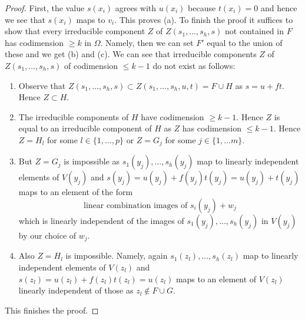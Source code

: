\begin{proof}
\medskip\noindent
First, the value $s(x_i)$ agrees with $u(x_i)$ because
$t(x_i) = 0$ and hence we see that $s(x_i)$ maps to $v_i$.
This proves (a).
To finish the proof it suffices to show that every irreducible
component $Z$ of $Z(s_1, \ldots, s_h, s)$ not contained in $F$
has codimension $\geq k$ in $\Omega$. Namely, then we can set $F'$
equal to the union of these and we get (b) and (c).
We can see that irreducible components $Z$ of $Z(s_1, \ldots, s_h, s)$
of codimension $\leq k - 1$ do not exist as follows:
\begin{enumerate}
\item Observe that
$Z(s_1, \ldots, s_h, s) \subset Z(s_1, \ldots, s_h, u, t) = F \cup H$
as $s = u + ft$. Hence $Z \subset H$.
\item The irreducible components of $H$ have codimension $\geq k - 1$.
Hence $Z$ is equal to an irreducible component of $H$
as $Z$ has codimension $\leq k - 1$.
Hence $Z = H_l$ for some $l \in \{1, \ldots, p\}$ or
$Z = G_j$ for some $j \in \{1, \ldots m\}$.
\item But $Z = G_j$ is impossible as $s_1(y_j), \ldots, s_h(y_j)$
map to linearly independent elements of $V(y_j)$ and
$s(y_j) = u(y_j) + f(y_j) t(y_j) = u(y_j) + t(y_j)$
maps to an element of the form
$$
\text{linear combination images of }s_i(y_j) + w_j
$$
which is linearly independent of the images of $s_1(y_j), \ldots, s_h(y_j)$
in $V(y_j)$ by our choice of $w_j$.
\item Also $Z = H_l$ is impossible. Namely, again
$s_1(z_l), \ldots, s_h(z_l)$ map to linearly independent
elements of $V(z_l)$ and $s(z_l) = u(z_l) + f(z_l) t(z_l) = u(z_l)$
maps to an element of $V(z_l)$ linearly independent of those
as $z_l \not \in F \cup G$.
\end{enumerate}
This finishes the proof.
\end{proof}